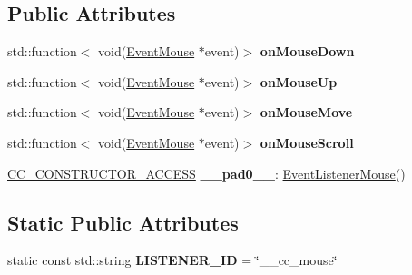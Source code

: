 \subsection*{Public Attributes}
\begin{DoxyCompactItemize}
\item 
\mbox{\label{classEventListenerMouse_a17a2dafb083a537249a487955dde0359}} 
std\+::function$<$ void(\hyperlink{classEventMouse}{Event\+Mouse} $\ast$event)$>$ {\bfseries on\+Mouse\+Down}
\item 
\mbox{\label{classEventListenerMouse_acc82f108d17ba2757cd475511e96bdf9}} 
std\+::function$<$ void(\hyperlink{classEventMouse}{Event\+Mouse} $\ast$event)$>$ {\bfseries on\+Mouse\+Up}
\item 
\mbox{\label{classEventListenerMouse_afa61a3c0ce1ba9d7c9c9ffd46d76f1d5}} 
std\+::function$<$ void(\hyperlink{classEventMouse}{Event\+Mouse} $\ast$event)$>$ {\bfseries on\+Mouse\+Move}
\item 
\mbox{\label{classEventListenerMouse_aa0c1537c58043a59a9b8c66f395733fb}} 
std\+::function$<$ void(\hyperlink{classEventMouse}{Event\+Mouse} $\ast$event)$>$ {\bfseries on\+Mouse\+Scroll}
\item 
\mbox{\label{classEventListenerMouse_aaa73892ae1f1db80111ba38dea645e0d}} 
\hyperlink{_2cocos2d_2cocos_2base_2ccConfig_8h_a25ef1314f97c35a2ed3d029b0ead6da0}{C\+C\+\_\+\+C\+O\+N\+S\+T\+R\+U\+C\+T\+O\+R\+\_\+\+A\+C\+C\+E\+SS} {\bfseries \+\_\+\+\_\+pad0\+\_\+\+\_\+}\+: \hyperlink{classEventListenerMouse}{Event\+Listener\+Mouse}()
\end{DoxyCompactItemize}
\subsection*{Static Public Attributes}
\begin{DoxyCompactItemize}
\item 
\mbox{\label{classEventListenerMouse_a3567240261f7c28b013aa96d0d35c88b}} 
static const std\+::string {\bfseries L\+I\+S\+T\+E\+N\+E\+R\+\_\+\+ID} = \char`\"{}\+\_\+\+\_\+cc\+\_\+mouse\char`\"{}
\end{DoxyCompactItemize}
